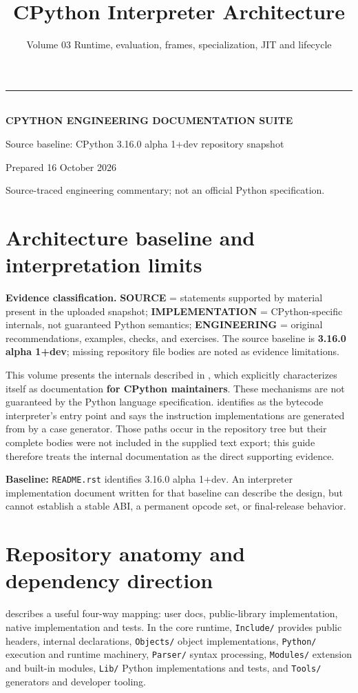 \documentclass[
  11pt,
]{report}
\title{CPython Interpreter Architecture}
\subtitle{Volume 03 \textbar{} Runtime, evaluation, frames,
specialization, JIT and lifecycle}
\author{}
\date{}
\makeatletter
\newcommand{\passthrough}[1]{#1}
\renewcommand{\maketitle}{%
  \hypersetup{pageanchor=false}%
\begin{titlepage}\pagecolor{CPNavy}\color{white}\sffamily
  \vspace*{0.8in}
  {\color{CPGold}\rule{2.1in}{4pt}}\\[16pt]
  {\Large\bfseries CPYTHON ENGINEERING DOCUMENTATION SUITE}\\[24pt]
  {\Huge\bfseries \@title\par}\vspace{19pt}
  \vfill
  {\normalsize Source baseline: CPython 3.16.0 alpha 1+dev repository snapshot}\par
  {\normalsize Prepared 16 October 2026}\par
  {\small\color{white!70} Source-traced engineering commentary; not an official Python specification.}\vspace{0.65in}
  \end{titlepage}\hypersetup{pageanchor=true}\nopagecolor\color{black}
  }
\makeatother
\begin{document}
\maketitle

{
\setcounter{tocdepth}{1}
\tableofcontents
}
\chapter{Architecture baseline and interpretation
limits}\label{architecture-baseline-and-interpretation-limits}

\begin{sourcebox}
\textbf{Evidence classification.} \textbf{SOURCE} = statements supported by material present in the uploaded snapshot; \textbf{IMPLEMENTATION} = CPython-specific internals, not guaranteed Python semantics; \textbf{ENGINEERING} = original recommendations, examples, checks, and exercises. The source baseline is \textbf{3.16.0 alpha 1+dev}; missing repository file bodies are noted as evidence limitations.
\end{sourcebox}

This volume presents the internals described in
, which explicitly characterizes
itself as documentation \textbf{for CPython maintainers}. These
mechanisms are not guaranteed by the Python language specification.
 identifies
 as the bytecode interpreter's
entry point and says the instruction implementations are generated from
 by a case generator. Those
paths occur in the repository tree but their complete bodies were not
included in the supplied text export; this guide therefore treats the
internal documentation as the direct supporting evidence.

\textbf{Baseline:} \passthrough{\lstinline!README.rst!} identifies
3.16.0 alpha 1+dev. An interpreter implementation document written for
that baseline can describe the design, but cannot establish a stable
ABI, a permanent opcode set, or final-release behavior.

\chapter{Repository anatomy and dependency
direction}\label{repository-anatomy-and-dependency-direction}

 describes a useful
four-way mapping: user docs, public-library implementation, native
implementation and tests. In the core runtime,
\passthrough{\lstinline!Include/!} provides public headers,
 internal declarations,
\passthrough{\lstinline!Objects/!} object implementations,
\passthrough{\lstinline!Python/!} execution and runtime machinery,
\passthrough{\lstinline!Parser/!} syntax processing,
\passthrough{\lstinline!Modules/!} extension and built-in modules,
\passthrough{\lstinline!Lib/!} Python implementations and tests, and
\passthrough{\lstinline!Tools/!} generators and developer tooling.
\end{document}
